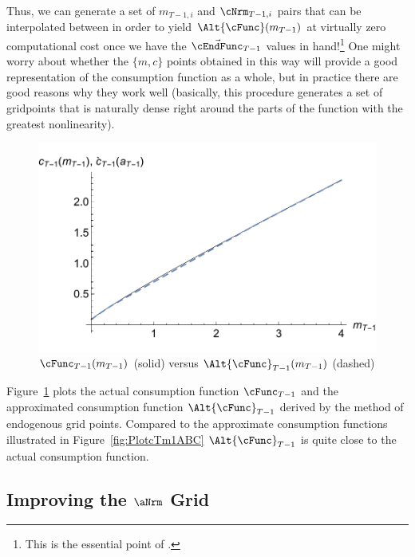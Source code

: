 \documentclass[titlepage, headings=optiontotocandhead]{\econtex}
\begin{document}
Thus, we can generate a set of ${m}_{T-1,i}$ and ${\cNrm}_{T-1,i}$
pairs that can be interpolated between in order to yield
$\Alt{\cFunc}({m}_{T-1})$ at virtually zero computational cost once we
have the $\vec{\cEndFunc}_{T-1}$ values in hand!\footnote{This is
  the essential point of \cite{carrollEGM}.} One might worry
about whether the $\{{m},{c}\}$ points obtained in this way will provide a
good representation of the consumption function as a whole, but in
practice there are good reasons why they work well (basically, this
procedure generates a set of gridpoints that is naturally dense right
around the parts of the function with the greatest nonlinearity).
\hypertarget{PlotComparecTm1AD}{}
\begin{figure}
  \includegraphics{./Figures/PlotComparecTm1AD}
  \caption{$\cFunc_{T-1}({m}_{T-1})$ (solid) versus $\Alt{\cFunc}_{T-1}({m}_{T-1})$ (dashed)}
  \label{fig:ComparecTm1AD}
\end{figure}
Figure~\ref{fig:ComparecTm1AD} plots the actual consumption function
${\cFunc}_{T-1}$ and the approximated consumption function $\Alt{\cFunc}_{T-1}$
derived by the method of endogenous grid points. Compared to the approximate consumption
functions illustrated in Figure~\ref{fig:PlotcTm1ABC} $\Alt{\cFunc}_{T-1}$ is quite close
to the actual consumption function.



\hypertarget{Improving-the-a-Grid}{}
\subsection{Improving the $\aNrm$ Grid}
\end{document}

